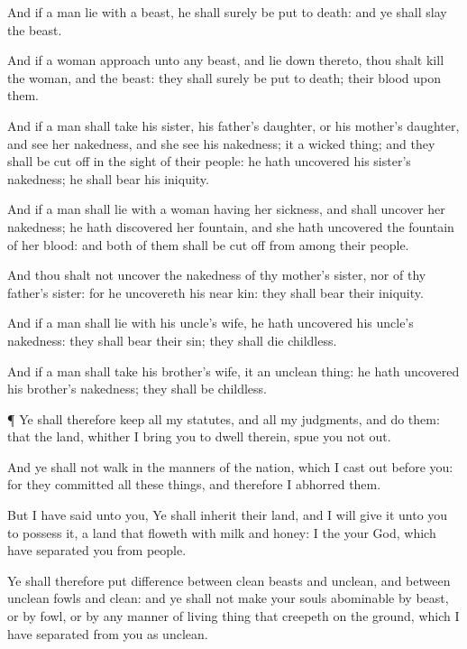 {And if a
man
lie with a
beast, he shall
surely be put to
death: and ye shall
slay the
beast.

And if a
woman
approach unto any
beast, and lie
down thereto, thou shalt
kill the
woman, and the
beast: they shall
surely be put to
death; their
blood
{} upon them.

And if a
man shall
take his
sister, his
father’s
daughter,
or his
mother’s
daughter, and
see her
nakedness, and she
see his
nakedness; it
{} a wicked
thing; and they shall be cut
off in the
sight of their
people: he hath
uncovered his
sister’s
nakedness; he shall
bear his
iniquity.

And if a
man shall
lie with a
woman having her
sickness, and shall
uncover her
nakedness; he hath
discovered her
fountain, and she hath
uncovered the
fountain of her
blood: and
both of them shall be cut
off from
among their
people.

And thou shalt not
uncover the
nakedness of thy
mother’s
sister, nor of thy
father’s
sister: for he
uncovereth his near
kin: they shall
bear their
iniquity.

And if a
man shall
lie with his
uncle’s wife, he hath
uncovered his
uncle’s
nakedness: they shall
bear their
sin; they shall
die
childless.

And if a
man shall
take his
brother’s
wife, it
{} an unclean
thing: he hath
uncovered his
brother’s
nakedness; they shall be
childless.


\par }{\PP {}¶ Ye shall therefore
keep all my
statutes, and all my
judgments, and
do them: that the
land, whither I
bring you to
dwell therein, spue you not
out.

And ye shall not
walk in the
manners of the
nation, which I cast
out
before you: for they
committed all these things, and therefore I
abhorred them.

But I have
said unto you, Ye shall
inherit their
land, and I will
give it unto you to
possess it, a
land that
floweth with
milk and
honey: I
{} the
{} your
God, which have
separated you from
{}
people.

Ye shall therefore put
difference between
clean
beasts and
unclean, and between
unclean
fowls and
clean: and ye shall not make your
souls
abominable by
beast, or by
fowl, or by any manner of living thing that
creepeth on the
ground, which I have
separated from you as
unclean.

}
